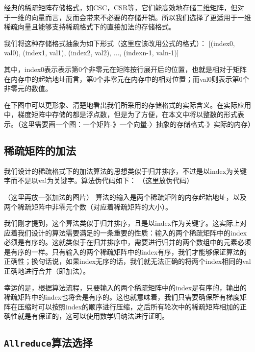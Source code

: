 经典的稀疏矩阵存储格式，如CSC，CSR等，它们能高效地存储二维矩阵，但对于一维的向量而言，反而会带来不必要的存储开销。所以我们选择了更适用于一维稀疏向量且能够支持稀疏格式下的直接加法的存储格式。

我们将这种存储格式抽象为如下形式（这里应该改用公式的格式）：
[(index0, val0), (index1, val1), (index2, val2), ..., (indexn-1, valn-1)]

其中，index0表示表示第0个非零元在矩阵按行展开后的位置，也就是相对于矩阵在内存中的起始地址而言，第0个非零元在内存中的相对位置；而val0则表示第0个非零元的数值。

在下图中可以更形象、清楚地看出我们所采用的存储格式的实际含义。在实际应用中，梯度矩阵中存储的都是浮点数，但是为了方便，在本文中将以整数的形式表示。（这里需要画一个图：一个矩阵-》一个向量-〉抽象的存储格式-》实际的内存）

\subsection{稀疏矩阵的加法}
我们设计的稀疏格式下的加法算法的思想类似于归并排序，不过是以index为关键字而不是以val为关键字。算法伪代码如下：
（这里放伪代码）

（这里再放一张加法的图片）
算法的输入是两个稀疏矩阵的内存起始地址，以及两个稀疏矩阵中非零元个数（对应着稀疏矩阵的大小）。

我们刚才提到，这个算法类似于归并排序，且是以index作为关键字。这实际上对应着我们设计的算法需要满足的一条重要的性质：输入的两个稀疏矩阵中的index必须是有序的。这就类似于在归并排序中，需要进行归并的两个数组中的元素必须是有序的一样。只有输入的两个稀疏矩阵中的index有序，我们才能够保证算法的正确性；换句话说，如果index无序的话，我们就无法正确的将两个index相同的val正确地进行合并（即加法）。

幸运的是，根据算法流程，只要输入的两个稀疏矩阵中的index是有序的，输出的稀疏矩阵中的index也将会是有序的。这也就意味着，我们只需要确保所有梯度矩阵在压缩时可以按照index的顺序进行压缩，之后所有轮次中的稀疏矩阵相加的正确性就是有保证的，这可以使用数学归纳法进行证明。



\subsection{\texttt{Allreduce}算法选择}

